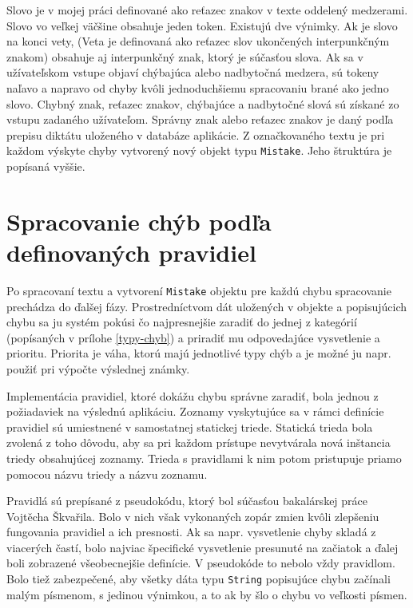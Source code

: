 \documentclass[12pt,oneside]{fithesis2}
\begin{document}
	\par Slovo je v mojej práci definované ako reťazec znakov v texte oddelený medzerami. Slovo vo veľkej väčšine obsahuje jeden token. Existujú dve výnimky. Ak je slovo na konci vety, (Veta je definovaná ako reťazec slov ukončených interpunkčným znakom) obsahuje aj interpunkčný znak, ktorý je súčasťou slova. Ak sa v užívateľskom vstupe objaví chýbajúca alebo nadbytočná medzera, sú tokeny naľavo a napravo od chyby kvôli jednoduchšiemu spracovaniu brané ako jedno slovo. Chybný znak, reťazec znakov, chýbajúce a nadbytočné slová sú získané zo vstupu zadaného užívateľom. Správny znak alebo reťazec znakov je daný podľa prepisu diktátu uloženého v databáze aplikácie. Z označkovaného textu je pri každom výskyte chyby vytvorený nový objekt typu \texttt{Mistake}. Jeho štruktúra je popísaná vyššie.
	
	\section{Spracovanie chýb podľa definovaných pravidiel}
     	  \par Po spracovaní textu a vytvorení \texttt{Mistake} objektu pre každú chybu spracovanie prechádza do ďalšej fázy. Prostredníctvom dát uložených v objekte a popisujúcich chybu sa ju systém pokúsi čo najpresnejšie zaradiť do jednej z kategórií (popísaných v prílohe \ref{typy-chyb}) a priradiť mu odpovedajúce vysvetlenie a prioritu. Priorita je váha, ktorú majú jednotlivé typy chýb a je možné ju napr. použiť pri výpočte výslednej známky.
     	  \par Implementácia pravidiel, ktoré dokážu chybu správne zaradiť, bola jednou z požiadaviek na výslednú aplikáciu. Zoznamy vyskytujúce sa v rámci definície pravidiel sú umiestnené v samostatnej statickej triede. Statická trieda bola zvolená z toho dôvodu, aby sa pri každom prístupe nevytvárala nová inštancia triedy obsahujúcej zoznamy. Trieda s pravidlami k nim potom pristupuje priamo pomocou názvu triedy a názvu zoznamu.
     	  \par Pravidlá sú prepísané z pseudokódu, ktorý bol súčasťou bakalárskej práce Vojtěcha Škvařila\cite{skvaril14}. Bolo v nich však vykonaných zopár zmien kvôli zlepšeniu fungovania pravidiel a ich presnosti. Ak sa napr. vysvetlenie chyby skladá z viacerých častí, bolo najviac špecifické vysvetlenie presunuté na začiatok a ďalej boli zobrazené všeobecnejšie definície. V pseudokóde to nebolo vždy pravidlom. Bolo tiež zabezpečené, aby všetky dáta typu \texttt{String} popisujúce chybu začínali malým písmenom, s jedinou výnimkou, a to ak by šlo o chybu vo veľkosti písmen.
\end{document}
